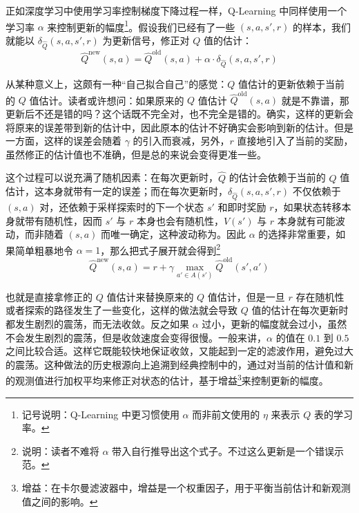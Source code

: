 正如深度学习中使用学习率控制梯度下降过程一样，Q-Learning 中同样使用一个学习率 $\alpha$ 来控制更新的幅度\footnote{记号说明：Q-Learning 中更习惯使用 $\alpha$ 而非前文使用的 $\eta$ 来表示 $Q$ 表的学习率。}。假设我们已经有了一些 $(s, a, s', r)$ 的样本，我们就能以 $\delta_{\hat Q} (s, a, s', r)$ 为更新信号，修正对 $Q$ 值的估计：
\[
    \hat Q^{\text{new}} (s, a) = \hat Q^{\text{old}} (s, a) + \alpha \cdot \delta_{\hat Q} (s, a, s', r)
\]

从某种意义上，这颇有一种“自己拟合自己”的感觉：$Q$ 值估计的更新依赖于当前的 $Q$ 值估计。读者或许想问：如果原来的 $Q$ 值估计 $\hat Q^{\text{old}} (s, a)$ 就是不靠谱，那更新后不还是错的吗？这个话既不完全对，也不完全是错的。确实，这样的更新会将原来的误差带到新的估计中，因此原本的估计不好确实会影响到新的估计。但是一方面，这样的误差会随着 $\gamma$ 的引入而衰减，另外，$r$ 直接地引入了当前的奖励，虽然修正的估计值也不准确，但是总的来说会变得更准一些。

这个过程可以说充满了随机因素：在每次更新时，$\hat Q$ 的估计会依赖于当前的 $Q$ 值估计，这本身就带有一定的误差；而在每次更新时，$\delta_{\hat Q} (s, a, s', r)$ 不仅依赖于 $(s, a)$ 对，还依赖于采样探索时的下一个状态 $s'$ 和即时奖励 $r$，如果状态转移本身就带有随机性，因而 $s'$ 与 $r$ 本身也会有随机性，$V(s')$ 与 $r$ 本身就有可能波动，而非随着 $(s, a)$ 而唯一确定，这种波动称为。因此 $\alpha$ 的选择非常重要，如果简单粗暴地令 $\alpha = 1$，那么把式子展开就会得到\footnote{说明：读者不难将 $\alpha$ 带入自行推导出这个式子。不过这么更新是一个错误示范。}
\[
    \hat Q^{\text{new}} (s, a) = r + \gamma \max_{a' \in A(s')} \hat Q^{\text{old}} (s', a')
\]

也就是直接拿修正的 $Q$ 值估计来替换原来的 $Q$ 值估计，但是一旦 $r$ 存在随机性或者探索的路径发生了一些变化，这样的做法就会导致 $Q$ 值的估计在每次更新时都发生剧烈的震荡，而无法收敛。反之如果 $\alpha$ 过小，更新的幅度就会过小，虽然不会发生剧烈的震荡，但是收敛速度会变得很慢。一般来讲，$\alpha$ 的值在 $0.1$ 到 $0.5$ 之间比较合适。这样它既能较快地保证收敛，又能起到一定的滤波作用，避免过大的震荡。这种做法的历史根源向上追溯到经典控制中的，通过对当前的估计值和新的观测值进行加权平均来修正对状态的估计，基于增益\footnote{增益：在卡尔曼滤波器中，增益是一个权重因子，用于平衡当前估计和新观测值之间的影响。}来控制更新的幅度。

